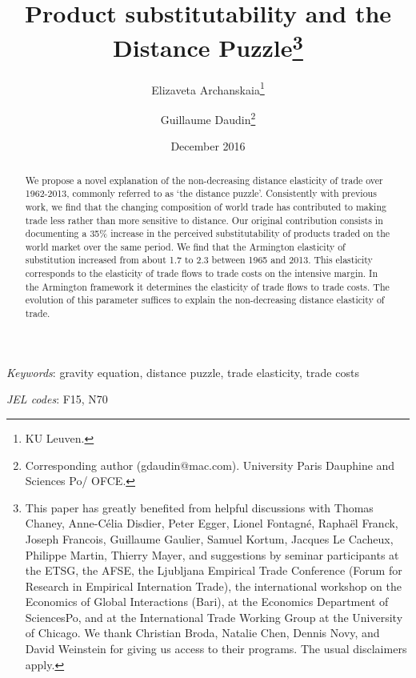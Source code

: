 \documentclass[12pt,twoside,a4paper,notitlepage]{article}
\begin{document}
\linespread{1}
\author{Elizaveta Archanskaia\thanks{KU Leuven.}\and Guillaume Daudin\thanks{Corresponding author (gdaudin@mac.com). University Paris Dauphine and Sciences Po/ OFCE.}}

\title{Product substitutability and the Distance Puzzle\thanks{This paper has greatly benefited from helpful discussions with Thomas Chaney, Anne-C\'elia Disdier, Peter Egger, Lionel Fontagn\'e, Raphaël Franck, Joseph Francois, Guillaume Gaulier, Samuel Kortum, Jacques Le Cacheux, Philippe Martin, Thierry Mayer, and suggestions by seminar participants at the ETSG, the AFSE, the Ljubljana Empirical Trade Conference (Forum for Research in Empirical Internation Trade), the international workshop on the Economics of Global Interactions (Bari), at the Economics Department of SciencesPo, and at the International Trade Working Group at the University of Chicago. We thank Christian Broda, Natalie Chen, Dennis Novy, and David Weinstein for giving us access to their programs. The usual disclaimers apply.}}
\date{December 2016
\\
}

\maketitle
\begin{abstract}
We propose a novel explanation of the non-decreasing distance elasticity of trade over 1962-2013, commonly referred to as `the distance puzzle'. Consistently with previous work, we find that the changing composition of world trade has contributed to making trade less rather than more sensitive to distance.
Our original contribution consists in documenting a 35\% increase in the perceived substitutability of products traded on the world market over the same period. We find that the Armington elasticity of substitution increased from about 1.7 to 2.3 between 1965 and 2013. This elasticity corresponds to the elasticity of trade flows to trade costs on the intensive margin. In the Armington framework it determines the elasticity of trade flows to trade costs. The evolution of this parameter suffices to explain the non-decreasing distance elasticity of trade. 
\end{abstract}

\textit{Keywords}: gravity equation, distance puzzle, trade elasticity, trade costs

\textit{JEL codes}: F15, N70
\clearpage
\end{document}
